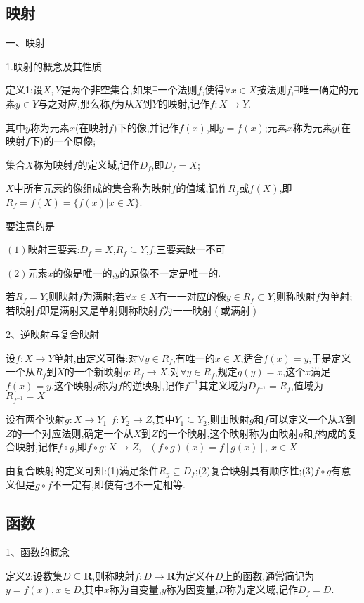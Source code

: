 \documentclass[utf8]{ctexart}
\begin{document}
\subsection{\heiti 映射}

一、映射

1.映射的概念及其性质

定义1:设$X,Y$是两个非空集合,如果$\exists $一个法则$f$,使得$\forall x\in X$按法则$f$,$\exists $唯一确定的元素$y\in Y$与之对应,那么称$f$为从$X$到$Y$的映射,记作$f:X\to Y$.

其中$y$称为元素$x$(在映射$f$)下的像,并记作$f(x)$,即$y=f(x)$;元素$x$称为元素$y$(在映射$f$下)的一个原像;

集合$X$称为映射$f$的定义域,记作$D_f$,即$D_f=X$;

$X$中所有元素的像组成的集合称为映射$f$的值域,记作$R_f$或$f(X)$,即$R_f=f(X)=\{ f(x)| x\in X\}$.

要注意的是

$(1)$映射三要素:$D_f=X$,$R_f\displaystyle\subseteq Y$,$f$.三要素缺一不可

$(2)$元素$x$的像是唯一的,$y$的原像不一定是唯一的.

若$R_f=Y$,则映射$f$为满射;若$\forall x\in X$有一一对应的像$y\in R_f\subset  Y$,则称映射$f$为单射;若映射$f$即是满射又是单射则称映射$f$为一一映射$(\text{或满射})$

2、逆映射与复合映射

设$f:X \to Y$单射,由定义可得:对$\forall y\in R_f$,有唯一的$x\in X$,适合$f(x)=y$,于是定义一个从$R_f$到$X$的一个新映射$g:R_f\to X$,对$\forall y\in R_f$,规定$g(y)=x$,这个$x$满足$f(x)=y$.这个映射$g$称为$f$的逆映射,记作$f^{-1}$其定义域为$D_{f^{-1}}=R_f$,值域为$R_{f^{-1}}=X$

设有两个映射$g:X\to Y_1\ \ f:Y_2\to Z$,其中$Y_1\subseteq Y_2$,则由映射$g$和$f$可以定义一个从$X$到$Z$的一个对应法则,确定一个从$X$到$Z$的一个映射,这个映射称为由映射$g$和$f$构成的复合映射,记作$f\circ g$,即$f\circ g :X\to Z, \ \ \ (f\circ g)(x)=f\left[g(x)\right] ,\ x\in X$

由复合映射的定义可知:(1)满足条件$R_g\subseteq D_f$;(2)复合映射具有顺序性;(3)$f\circ g$有意义但是$ g\circ f$不一定有,即使有也不一定相等.

\subsection{\heiti 函数}

1、函数的概念

定义2:设数集$D\subseteq  \mathbf{R} $,则称映射$f:D\to  \mathbf{R} $为定义在$D$上的函数,通常简记为$y=f(x),x\in D$,其中$x$称为自变量,$y$称为因变量,$D$称为定义域,记作$D_f=D$.
\end{document}
